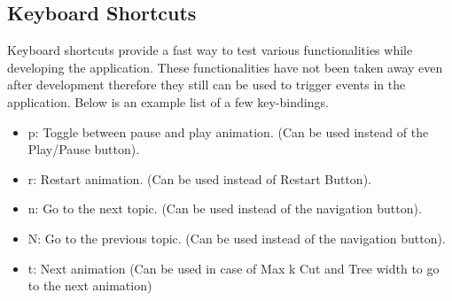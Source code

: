 \subsection{Keyboard Shortcuts}
Keyboard shortcuts provide a fast way to test various functionalities while
developing the application.  These functionalities have not been taken away
even after development therefore they still can be used to trigger events in
the application. Below is an example list of a few key-bindings.
\begin{itemize}
\item p: Toggle between pause and play animation. (Can be used instead of the Play/Pause button).
\item r: Restart animation. (Can be used instead of Restart Button).
\item n: Go to the next topic. (Can be used instead of the navigation button).
\item N: Go to the previous topic. (Can be used instead of the navigation button).
\item t: Next animation (Can be used in case of Max k Cut and Tree width to go to the next animation)
\end{itemize}
